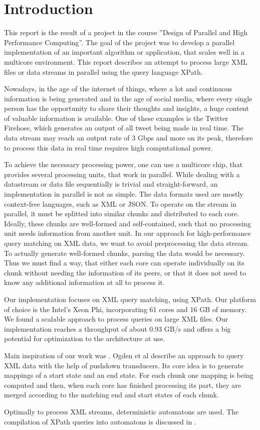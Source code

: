 \section{Introduction}\label{sec:intro}

This report is the result of a project in the course ''Design of Parallel and High Performance Computing''. The goal of the project was to develop a parallel implementation of an important algorithm or application, that scales well in a multicore environment. This report describes an attempt to process large XML files or data streams in parallel using the query language XPath.

 Nowadays, in the age of the internet of things, where a lot and continuous information is being generated and in the age of social media, where every single person has the opportunity to share their thoughts and insights, a huge content of valuable information is available. One of these examples is the Twitter Firehose, which generates an output of all tweet being made in real time. The data stream may reach an output rate of 3 Gbps and more on  its peak, therefore to process this data in real time requires high computational power.

To achieve the necessary processing power, one can use a multicore chip, that provides several processing units, that work in parallel. While dealing with a datastream or data file sequentially is trivial and straight-forward, an implementation in parallel is not as simple. The data formats used are mostly context-free languages, such as XML or JSON. To operate on the stream in parallel, it must be splitted into similar chunks and distributed to each core. Ideally, these chunks are well-formed and self-contained, such that no processing unit needs information from another unit. In our approach for high-performance query matching on XML data, we want to avoid preprocessing the data stream. To actually generate well-formed chunks, parsing the data would be necessary. Thus we must find a way, that either each core can operate individually on its chunk without needing the information of its peers, or that it does not need to know any additional information at all to process it.

Our implementation focuses on XML query matching, using XPath. Our platform of choice is the Intel's Xeon Phi, incorporating 61 cores and 16 GB of memory. We found a scalable approach to process queries on large XML files. Our implementation reaches a throughput of about 0.93 GB/s and offers a big potential for optimization to the architecture at use. 

 Main inspiration of our work was \cite{Ogden2013}. Ogden et al describe an approach to query XML data with the help of pushdown transducers. Its core idea is to generate mappings of a start state and an end state. For each chunk one mapping is being computed and then, when each core has finished processing its part, they are merged according to the matching end and start states of each chunk.

Optimally to process XML streams, deterministic automatons are used. The compilation of XPath queries into automatons is discussed in \cite{Green2004}.